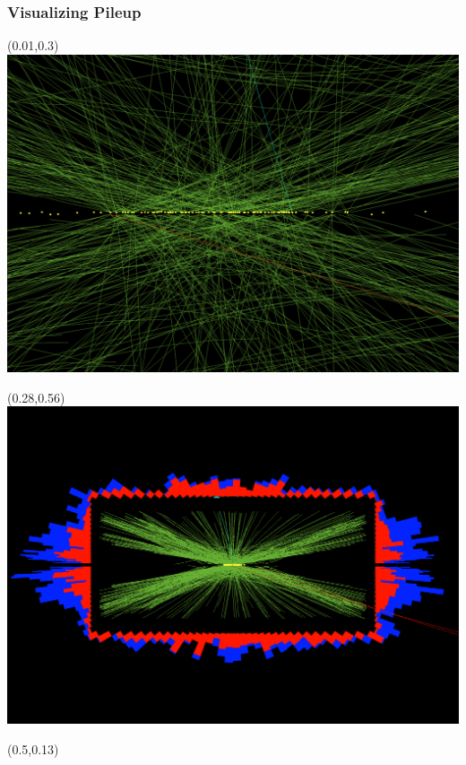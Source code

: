 \begin{frame}[t]
\begin{columns}[T]
\begin{column}{0.48\textwidth}
		\end{column}
	\end{columns}
\end{frame}

\begin{frame}[t]\frametitle{Visualizing Pileup}
    \begin{textblock}{0.48}(0.01,0.3)
    	\includegraphics[width=\textwidth]{images/pileup/198609-56-3565522e.png}
    \end{textblock}
    \begin{textblock}{0.2}(0.28,0.56)
    	\includegraphics[width=\textwidth]{images/pileup/198609-56-3565522b.png}
    \end{textblock}
    \begin{textblock}{0.48}(0.5,0.13)

\end{textblock}
\end{frame}
